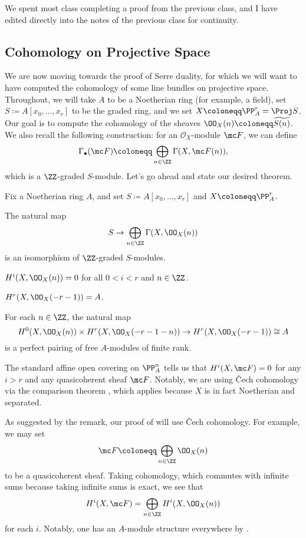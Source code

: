 \documentclass[../notes.tex]{subfiles}
\begin{document}
We spent most class completing a proof from the previous class, and I have edited directly into the notes of the previous class for continuity.

\subsection{Cohomology on Projective Space}
We are now moving towards the proof of Serre duality, for which we will want to have computed the cohomology of some line bundles on projective space. Throughout, we will take $A$ to be a Noetherian ring (for example, a field), set $S\coloneqq A[x_0,\ldots,x_r]$ to be the graded ring, and we set $X\coloneqq\PP^r_A=\Proj S$. Our goal is to compute the cohomology of the sheaves $\OO_X(n)\coloneqq\widetilde{S(n)}$. We also recall the following construction: for an $\mathcal O_X$-module $\mc F$, we can define
\[\Gamma_\bullet(\mc F)\coloneqq\bigoplus_{n\in\ZZ}\Gamma(X,\mc F(n)),\]
which is a $\ZZ$-graded $S$-module. Let's go ahead and state our desired theorem.
\begin{theorem} \label{thm:cohom-proj-space}
	Fix a Noetherian ring $A$, and set $S\coloneqq A[x_0,\ldots,x_r]$ and $X\coloneqq\PP^r_A$.
	\begin{listalph}
		\item The natural map
		\[S\to\bigoplus_{n\in\ZZ}\Gamma(X,\OO_X(n))\]
		is an isomorphism of $\ZZ$-graded $S$-modules.
		\item $H^i(X,\OO_X(n))=0$ for all $0<i<r$ and $n\in\ZZ$.
		\item $H^r(X,\OO_X(-r-1))=A$.
		\item For each $n\in\ZZ$, the natural map
		\[H^0(X,\OO_X(n))\times H^r(X,\OO_X(-r-1-n))\to H^r(X,\OO_X(-r-1))\cong A\]
		is a perfect pairing of free $A$-modules of finite rank.
	\end{listalph}
\end{theorem}
\begin{remark}
	The standard affine open covering on $\PP^n_A$ tells us that $H^i(X,\mc F)=0$ for any $i>r$ and any quasicoherent sheaf $\mc F$. Notably, we are using \v Cech cohomology via the comparison theorem , which applies because $X$ is in fact Noetherian and separated.
\end{remark}
As suggested by the remark, our proof of  will use \v Cech cohomology. For example, we may set
\[\mc F\coloneqq\bigoplus_{n\in\ZZ}\OO_X(n)\]
to be a quasicoherent sheaf. Taking cohomology, which commutes with infinite sums because taking infinite sums is exact, we see that
\[H^i(X,\mc F)=\bigoplus_{n\in\ZZ}H^i(X,\OO_X(n))\]
for each $i$. Notably, one has an $A$-module structure everywhere by .
\end{document}
